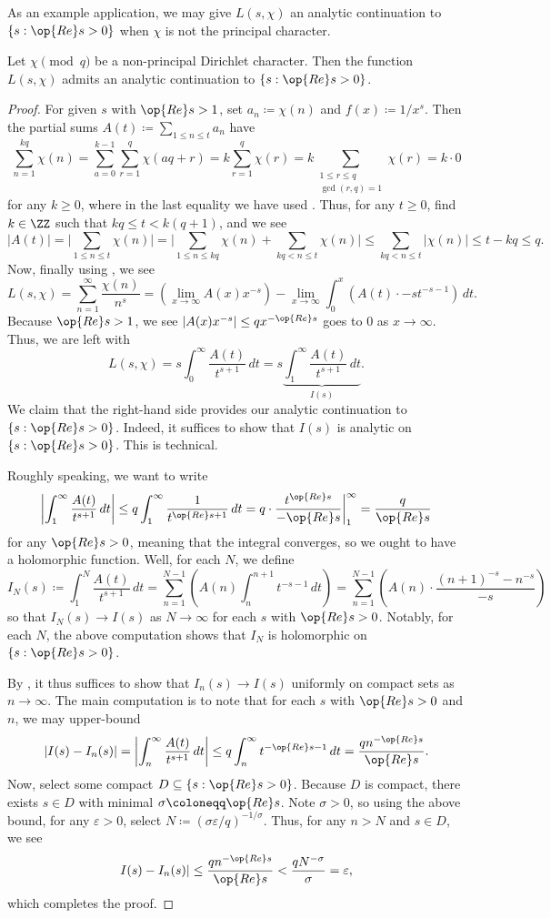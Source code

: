 \documentclass[../notes.tex]{subfiles}
\begin{document}
As an example application, we may give $L(s,\chi)$ an analytic continuation to $\{s:\op{Re}s>0\}$ when $\chi$ is not the principal character.
\begin{proposition} \label{prop:continue-l-chi}
	Let $\chi\pmod q$ be a non-principal Dirichlet character. Then the function $L(s,\chi)$ admits an analytic continuation to $\{s:\op{Re}s>0\}$.
\end{proposition}
\begin{proof}
	For given $s$ with $\op{Re}s>1$, set $a_n\coloneqq\chi(n)$ and $f(x)\coloneqq1/x^s$. Then the partial sums $A(t)\coloneqq\sum_{1\le n\le t}a_n$ have
	\[\sum_{n=1}^{kq}\chi(n)=\sum_{a=0}^{k-1}\sum_{r=1}^q\chi(aq+r)=k\sum_{r=1}^q\chi(r)=k\sum_{\substack{1\le r\le q\\\gcd(r,q)=1}}\chi(r)=k\cdot0\]
	for any $k\ge0$, where in the last equality we have used . Thus, for any $t\ge0$, find $k\in\ZZ$ such that $kq\le t<k(q+1)$, and we see
	\[|A(t)|=\Bigg|\sum_{1\le n\le t}\chi(n)\Bigg|=\Bigg|\sum_{1\le n\le kq}\chi(n)+\sum_{kq<n\le t}\chi(n)\Bigg|\le\sum_{kq<n\le t}|\chi(n)|\le t-kq\le q.\]
	Now, finally using , we see
	\[L(s,\chi)=\sum_{n=1}^\infty\frac{\chi(n)}{n^s}=\left(\lim_{x\to\infty}A(x)x^{-s}\right)-\lim_{x\to\infty}\int_0^x\left(A(t)\cdot -st^{-s-1}\right)\,dt.\]
	Because $\op{Re}s>1$, we see $\left|A(x)x^{-s}\right|\le qx^{-\op{Re}s}$ goes to $0$ as $x\to\infty$. Thus, we are left with
	\[L(s,\chi)=s\int_0^\infty\frac{A(t)}{t^{s+1}}\,dt=s\underbrace{\int_1^\infty\frac{A(t)}{t^{s+1}}\,dt}_{I(s)}.\]
	We claim that the right-hand side provides our analytic continuation to $\{s:\op{Re}s>0\}$. Indeed, it suffices to show that $I(s)$ is analytic on $\{s:\op{Re}s>0\}$. This is technical.
	
	Roughly speaking, we want to write
	\[\left|\int_1^\infty\frac{A(t)}{t^{s+1}}\,dt\right|\le q\int_1^\infty\frac1{t^{\op{Re}s+1}}\,dt=q\cdot\frac{t^{\op{Re}s}}{-\op{Re}s}\bigg|_1^\infty=\frac q{\op{Re}s}\]
	for any $\op{Re}s>0$, meaning that the integral converges, so we ought to have a holomorphic function. Well, for each $N$, we define
	\[I_N(s)\coloneqq\int_1^N\frac{A(t)}{t^{s+1}}\,dt=\sum_{n=1}^{N-1}\left(A(n)\int_n^{n+1}t^{-s-1}\,dt\right)=\sum_{n=1}^{N-1}\left(A(n)\cdot\frac{(n+1)^{-s}-n^{-s}}{-s}\right)\]
	so that $I_N(s)\to I(s)$ as $N\to\infty$ for each $s$ with $\op{Re}s>0$. Notably, for each $N$, the above computation shows that $I_N$ is holomorphic on $\{s:\op{Re}s>0\}$.

	By , it thus suffices to show that $I_n(s)\to I(s)$ uniformly on compact sets as $n\to\infty$. The main computation is to note that for each $s$ with $\op{Re}s>0$ and $n$, we may upper-bound
	\[|I(s)-I_n(s)|=\left|\int_n^\infty\frac{A(t)}{t^{s+1}}\,dt\right|\le q\int_n^\infty t^{-\op{Re}s-1}\,dt=\frac{qn^{-\op{Re}s}}{\op{Re}s}.\]
	Now, select some compact $D\subseteq\{s:\op{Re}s>0\}$. Because $D$ is compact, there exists $s\in D$ with minimal $\sigma\coloneqq\op{Re}s$. Note $\sigma>0$, so using the above bound, for any $\varepsilon>0$, select $N\coloneqq(\sigma\varepsilon/q)^{-1/\sigma}$. Thus, for any $n>N$ and $s\in D$, we see
	\[I(s)-I_n(s)|\le\frac{qn^{-\op{Re}s}}{\op{Re}s}<\frac{qN^{-\sigma}}{\sigma}=\varepsilon,\]
	which completes the proof.
\end{proof}
\end{document}
